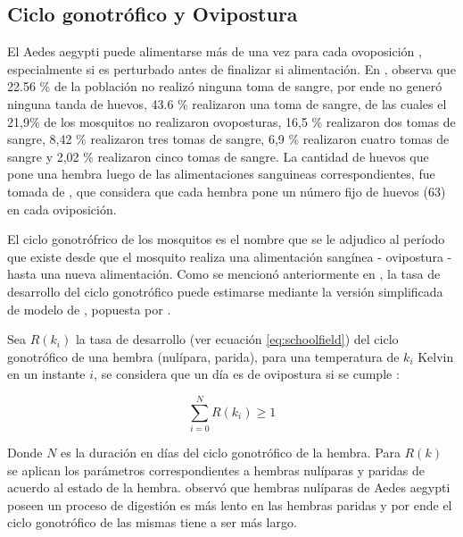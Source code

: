 \subsection{Ciclo gonotrófico y Ovipostura}
\label{sec:cap4-ovipostura-alimentacion}
El Aedes aegypti puede alimentarse más de una vez para cada ovoposición \citet{scott1993detection},
especialmente si es perturbado antes de finalizar si alimentación. En \citet{osoriopontificia},
observa que  22.56 \% de la población no realizó ninguna toma de sangre, por ende no generó
ninguna tanda de huevos,  43.6 \% realizaron una toma de sangre, de las cuales el 21,9\% de los
mosquitos no realizaron ovoposturas, 16,5 \% realizaron dos tomas de sangre, 8,42 \% realizaron
tres tomas de sangre, 6,9 \% realizaron cuatro tomas de sangre y 2,02 \% realizaron cinco tomas de
sangre. La cantidad de huevos que pone una hembra luego de las alimentaciones sanguineas
correspondientes, fue tomada de \citet{otero2006stochastic}, que considera que cada hembra pone un
número fijo de huevos (63) en cada oviposición.

El ciclo gonotrófrico de los mosquitos es el nombre que se le adjudico al período que existe desde
que el mosquito realiza una alimentación sangínea - ovipostura - hasta una nueva alimentación.
Como se mencionó anteriormente en , la tasa de desarrollo
del ciclo gonotrófico puede estimarse mediante la versión simplificada de modelo de
\citet{sharpe1977reaction}, popuesta por \citet{schoolfield1981non}.

Sea $R(k_{i})$ la tasa de desarrollo (ver ecuación \eqref{eq:schoolfield}) del ciclo gonotrófico
de una hembra (nulípara, parida), para una temperatura de $k_{i}$ Kelvin en un instante $i$, se considera que un día
es de ovipostura si se cumple :

\begin{equation}
\label{eq:ciclo-gonotrofico-ovipostura}
    \sum_{i=0}^{N} R(k_{i}) \geq 1
\end{equation}

Donde $N$ es la duración en días del ciclo gonotrófico de la hembra. Para $R(k)$ se aplican los
parámetros correspondientes a hembras nulíparas y paridas de acuerdo al estado de la hembra.
\cite{edman1987host} observó que hembras nulíparas de Aedes aegypti poseen un proceso de digestión
es más lento en las hembras paridas y por ende el ciclo gonotrófico de las mismas tiene a ser más
largo.

